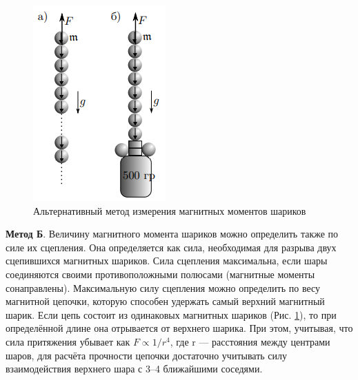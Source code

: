 \begin{figure}
    \includegraphics[width=\linewidth]{methodB.png}
    \caption{Альтернативный метод измерения магнитных моментов шариков}
    \label{fig:methodB}
\end{figure}
\textbf{Метод Б}. Величину магнитного момента шариков можно определить также по силе их сцепления. Она определяется как сила, необходимая для разрыва двух сцепившихся магнитных шариков. Сила сцепления
максимальна, если шары соединяются своими противоположными полюсами (магнитные моменты сонаправлены).
Максимальную силу сцепления можно
определить по весу магнитной цепочки, которую способен удержать самый верхний магнитный шарик. Если цепь состоит из одинаковых магнитных шариков (Рис. \ref{fig:methodB}), то
при определённой длине она отрывается от
верхнего шарика. При этом, учитывая, что
сила притяжения убывает как $F\propto 1/r^4$, где
r — расстояния между центрами шаров, для
расчёта прочности цепочки достаточно учитывать силу взаимодействия верхнего шара
с 3–4 ближайшими соседями.

